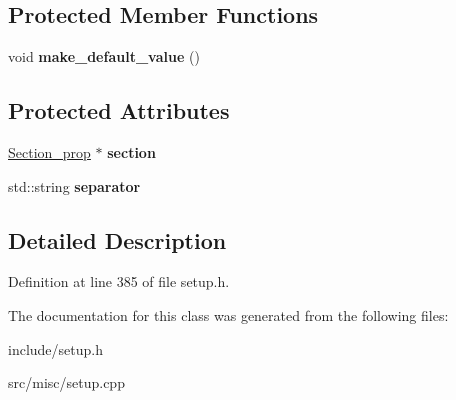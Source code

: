 \subsection*{Protected Member Functions}
\begin{DoxyCompactItemize}
\item 
\hypertarget{classProp__multival_a0a894a156a00f00d82f119a415619498}{void {\bfseries make\-\_\-default\-\_\-value} ()}\label{classProp__multival_a0a894a156a00f00d82f119a415619498}

\end{DoxyCompactItemize}
\subsection*{Protected Attributes}
\begin{DoxyCompactItemize}
\item 
\hypertarget{classProp__multival_a81ace37ba9062aea3513ddb30ccba50d}{\hyperlink{classSection__prop}{Section\-\_\-prop} $\ast$ {\bfseries section}}\label{classProp__multival_a81ace37ba9062aea3513ddb30ccba50d}

\item 
\hypertarget{classProp__multival_ab7f4e11117e972a1a1fcc718bd52201a}{std\-::string {\bfseries separator}}\label{classProp__multival_ab7f4e11117e972a1a1fcc718bd52201a}

\end{DoxyCompactItemize}


\subsection{Detailed Description}


Definition at line 385 of file setup.\-h.



The documentation for this class was generated from the following files\-:\begin{DoxyCompactItemize}
\item 
include/setup.\-h\item 
src/misc/setup.\-cpp\end{DoxyCompactItemize}
